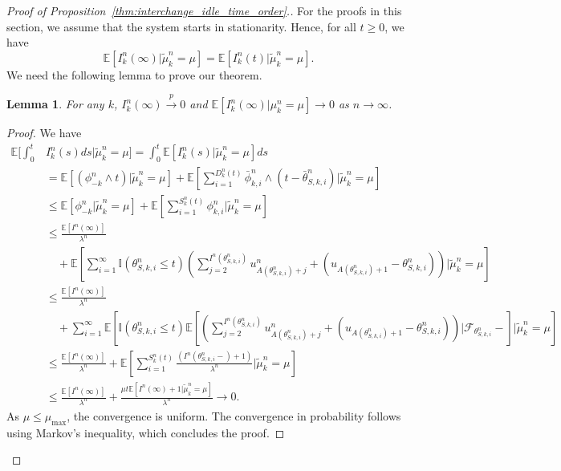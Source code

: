 \documentclass[a4paper,11pt,twoside]{article}
\numberwithin{equation}{section}
\numberwithin{figure}{section}
\theoremstyle{plain}
\newtheorem{lemma}[theorem]{Lemma}
\newcommand{\cF}{\mathcal{F}}
\newcommand{\EE}{\mathbb{E}}
\newcommand{\II}{\mathbb{I}}
\newcommand{\1}{\mathbbm{1}}
\newcommand{\toP}{\stackrel{p}{\rightarrow}}
\begin{document}
\begin{proof}[Proof of Proposition~\ref{thm:interchange_idle_time_order}.]
For the proofs in this section, we assume that the system starts in stationarity. Hence, for all $t\geq 0$, we have
\[
\EE[I_k^n(\infty)|\tilde{\mu}_k^n=\mu] = \EE[I_k^n(t)|\tilde{\mu}_k^n=\mu].
\]
We need the following lemma to prove our theorem. 
\begin{lemma}\label{lem:idleness_conv_zero}
For any $k$, $I_k^n(\infty)\toP 0$ and $\EE[I_k^n(\infty)|\mu_k^n=\mu]\to 0$ as $n\to \infty$.
\end{lemma}
\begin{proof}
We have 
\begin{align*}
 \EE\Big[\int_0^t & I_k^n(s)  ds|\tilde{\mu}_k^n=\mu\Big]
=\int_0^t\EE[I_k^n(s)|\tilde{\mu}_k^n=\mu]ds
\\
&
=\EE[(\phi_{-k}^n\wedge t)|\tilde{\mu}_k^n=\mu]+\EE\left[\sum_{i=1}^{D_k^n(t)}\bar{\phi}_{k,i}^n\wedge (t-\bar{\theta}_{S,k,i}^n)|\tilde{\mu}_k^n=\mu\right]\\
&\leq \EE[\phi_{-k}^n|\tilde{\mu}_k^n=\mu]+ \EE\left[\sum_{i=1}^{S_k^n(t)}\phi_{k,i}^n|\tilde{\mu}_k^n=\mu\right]\\
&\leq \frac{\EE[I^n(\infty)]}{\lambda^n}\\&\quad+\EE\left[\sum_{i=1}^{\infty}\II(\theta_{S,k,i}^n\leq t)\left(\sum_{j=2}^{I^n(\theta_{S,k,i}^n)}u_{A(\theta_{S,k,i}^n)+j}^n+(u_{A(\theta_{S,k,i}^n)+1}-\theta_{S,k,i}^n)\right)|\tilde{\mu}_k^n=\mu\right]\\
&\leq \frac{\EE[I^n(\infty)]}{\lambda^n}\\&
\quad+\sum_{i=1}^{\infty}\EE\left[\II(\theta_{S,k,i}^n\leq t)\EE\left[\left(\sum_{j=2}^{I^n(\theta_{S,k,i}^n)}u_{A(\theta_{S,k,i}^n)+j}^n+(u_{A(\theta_{S,k,i}^n)+1}-\theta_{S,k,i}^n)\right)|\cF_{\theta_{S,k,i}^n}-\right]|\tilde{\mu}_k^n=\mu\right]\\
&\leq \frac{\EE[I^n(\infty)]}{\lambda^n}+\EE\left[\sum_{i=1}^{S_k^n(t)}\frac{(I^n(\theta_{S,k,i}^n-)+1)}{\lambda^n}|\tilde{\mu}_k^n=\mu\right]\\
&\leq \frac{\EE[I^n(\infty)]}{\lambda^n}+\frac{\mu t\EE[I^n(\infty)+1|\tilde{\mu}_k^n=\mu]}{\lambda^n}\to 0.
\end{align*}
As $\mu\leq \mu_{\max}$, the convergence is uniform. The convergence in probability follows using Markov's inequality, which concludes the proof.\end{proof}


\end{proof}
\end{document}
